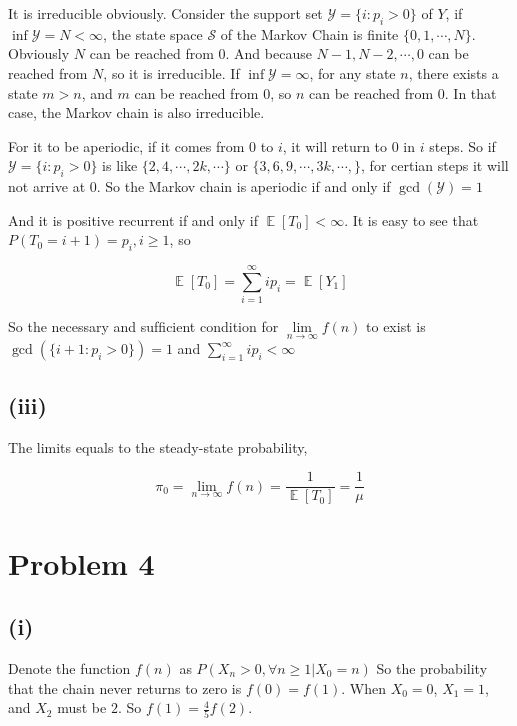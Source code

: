 \documentclass{article}
\DeclareMathOperator{\E}{\mathbb{E}}
\begin{document}
It is irreducible obviously. Consider the support set $\mathcal{Y}=\{i:p_i >0 \} $ of $Y$, if $\inf \mathcal{Y} = N < \infty$, the state space $\mathcal{S}$ of the Markov Chain is finite $\{0,1,\cdots,N\}$. Obviously $N$ can be reached from $0$.  And because $N-1,N-2,\cdots,0$ can be reached from $N$, so it is irreducible. If $\inf \mathcal{Y} =  \infty$, for any state $n$, there exists a state $m>n$, and  $m$ can be reached from $0$, so $n$ can be reached from $0$. In that case, the Markov chain is also irreducible.

For it to be aperiodic, if it comes from 0 to $i$, it will return to 0 in $i$ steps. So if $\mathcal{Y}=\{i:p_i >0 \} $ is like $\{2,4,\cdots,2k,\cdots\}$ or $\{3,6,9,\cdots,3k,\cdots,\}$, for certian steps it will not arrive at $0$. So the Markov chain is aperiodic if and only if $\operatorname{gcd}(\mathcal{Y} ) = 1$

And it is positive recurrent if and only if $\E[T_0] < \infty$. It is easy to see that $P(T_0 = i+1) = p_i, i\geqslant 1$, so 

\begin{equation}
    \E[T_0] = \sum_{i=1}^{\infty} ip_i = \E[Y_1] 
\end{equation}

So the necessary and sufﬁcient condition for $\lim\limits_{n\to\infty} f(n)$ to exist is $\operatorname{gcd}(\{i+1: p_i >0\}) = 1$ and $\sum_{i=1}^{\infty} ip_i  < \infty$

\subsection{(iii)}

The limits equals to the steady-state probability, 

\begin{equation}
    \pi_0 = \lim_{n\to\infty} f(n) = \frac{1}{\E[T_0]} = \frac{1}{\mu}
\end{equation}

\section{Problem 4}

\subsection{(i)}

Denote the function $f(n)$ as $P(X_n >0, \forall n\geqslant 1 | X_0 = n)$ So the probability that the chain never returns to zero is $f(0) = f(1)$. When $X_0=0$, $X_1=1$, and  $X_2$ must be $2$. So $f(1) = \frac{4}{5}f(2)$.
\end{document}
